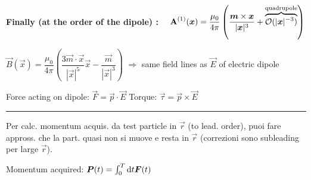 \begin{squishlist}
\item \textbf{Finally (at the order of the dipole) :} $\quad  \vec{\rm{A}}^{(1)}(\vec{x}) =  \dfrac{\mu_0}{4\pi}\left(\dfrac{\vec{m}\times\vec{x}}{|\vec{x}|^3} + \overbrace{\mathcal{O}(|\vec{x}|^{-3})}^\text{quadrupole}\right)$

\item $\vec{B}(\vec{x}) = \dfrac{\mu_0}{4 \pi} \left( \dfrac{3 \vec{m}\cdot \vec{x}}{|\vec{x}|^5} \vec{x} - \dfrac{\vec{m}}{|\vec{x}|^3}\right)$ $\Longrightarrow$ same field lines as $\vec{E}$ of electric dipole

\item Force acting on dipole: $\vec{F} = \vec{p} \cdot \vec{E}$ \squishsep Torque: $\vec{\tau} = \vec{p} \times \vec{E}$

\vspace{-0.1cm}\rule{\columnwidth}{0.5pt}\vspace{-0.1cm}
\item Per calc. momentum acquis. da test particle in $\vec{r}$ (to lead. order), puoi fare appross. che la part. quasi non si muove e resta in $\vec{r}$ (correzioni sono subleading per large $\vec{r}$).
\item Momentum acquired: $\vec{P}(t) = \int_0^T \ud t \vec{F}(t)$

\end{squishlist}

\columnbreak


